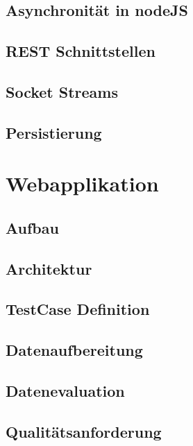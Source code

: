 		\subsection{Asynchronität in nodeJS}
		\subsection{REST Schnittstellen}
		\subsection{Socket Streams}
		\subsection{Persistierung}
	\section{Webapplikation}
		\subsection{Aufbau}
		\subsection{Architektur}
		\subsection{TestCase Definition}
		\subsection{Datenaufbereitung}
		\subsection{Datenevaluation}
		\subsection{Qualitätsanforderung}
